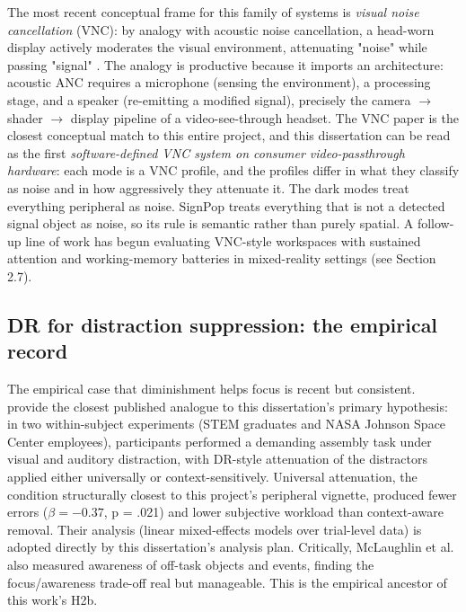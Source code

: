 The most recent conceptual frame for this family of systems is \textit{visual noise cancellation} (VNC): by
analogy with acoustic noise cancellation, a head-worn display actively moderates the visual
environment, attenuating "noise" while passing "signal" \citep{hong2024}. The analogy is productive
because it imports an architecture: acoustic ANC requires a
microphone (sensing the environment), a processing stage, and a speaker (re-emitting a modified
signal), precisely the camera $\rightarrow$ shader $\rightarrow$ display pipeline of a video-see-through headset. The VNC
paper is the closest conceptual match to this entire project, and this dissertation can be read as
the first \textit{software-defined VNC system on consumer video-passthrough hardware}: each mode is a VNC
profile, and the profiles differ in what they classify as noise and in how aggressively they
attenuate it. The dark modes treat everything peripheral as noise. SignPop treats everything that is
not a detected signal object as noise, so its rule is semantic rather than purely spatial. A follow-up line of work has begun evaluating VNC-style workspaces with sustained
attention and working-memory batteries in mixed-reality settings (see Section 2.7).

\subsection{DR for distraction suppression: the empirical record}

The empirical case that diminishment helps focus is recent but consistent. \citet{mclaughlin2025}
provide the closest published analogue to this dissertation's primary hypothesis: in two
within-subject experiments (STEM graduates and NASA Johnson Space Center employees), participants
performed a demanding assembly task under visual and auditory distraction, with DR-style attenuation
of the distractors applied either universally or context-sensitively. Universal attenuation, the
condition structurally closest to this project's peripheral vignette, produced fewer errors
($\beta = -0.37$, p = .021) and lower subjective workload than context-aware removal. Their analysis
(linear mixed-effects models over trial-level data) is adopted directly by this dissertation's
analysis plan. Critically, McLaughlin et al. also measured awareness of off-task objects and events,
finding the focus/awareness trade-off real but manageable. This is the empirical ancestor of this
work's H2b.

